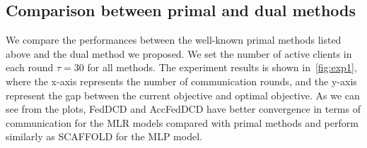 \subsection{Comparison between primal and dual methods} \label{sec:exp1}

We compare the performances between the well-known primal methods listed above and the dual method we proposed. We set the number of active clients in each round $\tau = 30$ for all methods. The experiment results is shown in~\autoref{fig:exp1}, 
where the x-axis represents the number of communication rounds, and the y-axis represent the gap between the current objective and optimal objective. 
As we can see from the plots, FedDCD and AccFedDCD have better convergence in terms of communication for the MLR models compared with primal methods and perform similarly as SCAFFOLD for the MLP model.

